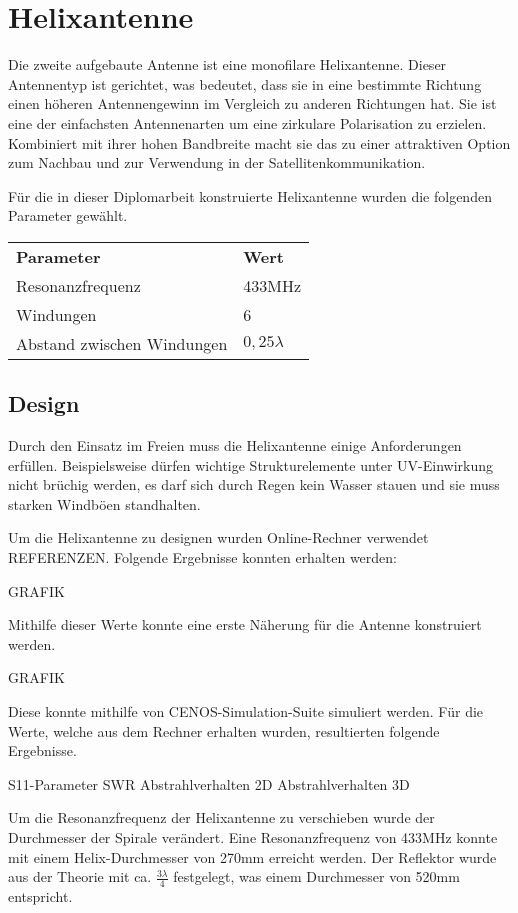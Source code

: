 \chapter{Helixantenne}
Die zweite aufgebaute Antenne ist eine monofilare Helixantenne. Dieser Antennentyp ist gerichtet, was bedeutet, dass sie in eine bestimmte Richtung einen höheren Antennengewinn im Vergleich zu anderen Richtungen hat. Sie ist eine der einfachsten Antennenarten um eine zirkulare Polarisation zu erzielen. Kombiniert mit ihrer hohen Bandbreite macht sie das zu einer attraktiven Option zum Nachbau und zur Verwendung in der Satellitenkommunikation.

Für die in dieser Diplomarbeit konstruierte Helixantenne wurden die folgenden Parameter gewählt.

\begin{tabular}{|l|l|}
	\textbf{Parameter} & \textbf{Wert}\\
	Resonanzfrequenz & 433MHz\\
	Windungen & 6\\
	Abstand zwischen Windungen & $0,25\lambda$
\end{tabular}

\section{Design}
Durch den Einsatz im Freien muss die Helixantenne einige Anforderungen erfüllen. Beispielsweise dürfen wichtige Strukturelemente unter UV-Einwirkung nicht brüchig werden, es darf sich durch Regen kein Wasser stauen und sie muss starken Windböen standhalten. 

Um die Helixantenne zu designen wurden Online-Rechner verwendet REFERENZEN. Folgende Ergebnisse konnten erhalten werden:

GRAFIK

Mithilfe dieser Werte konnte eine erste Näherung für die Antenne konstruiert werden. 

GRAFIK

Diese konnte mithilfe von CENOS-Simulation-Suite simuliert werden. Für die Werte, welche aus dem Rechner erhalten wurden, resultierten folgende Ergebnisse.

S11-Parameter
SWR
Abstrahlverhalten 2D
Abstrahlverhalten 3D

Um die Resonanzfrequenz der Helixantenne zu verschieben wurde der Durchmesser der Spirale verändert. Eine Resonanzfrequenz von 433MHz konnte mit einem Helix-Durchmesser von 270mm erreicht werden. Der Reflektor wurde aus der Theorie mit ca. $\frac{3\lambda}{4}$ festgelegt, was einem Durchmesser von 520mm entspricht.


